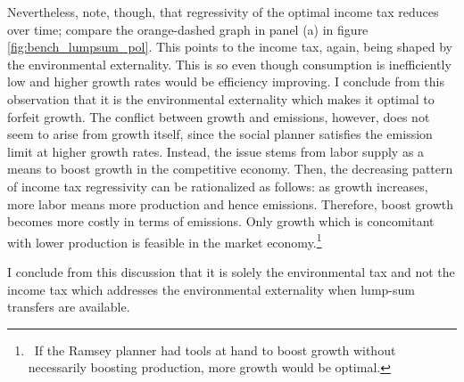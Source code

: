 Nevertheless, note, though, that regressivity of the optimal income tax reduces over time; compare the orange-dashed graph in panel (a) in figure \ref{fig:bench_lumpsum_pol}. This points to the income tax, again, being shaped by the environmental externality.
This is so even though consumption is inefficiently low and higher growth rates would be efficiency improving. I conclude from this observation that it is the environmental externality which makes it optimal to forfeit growth. 
The conflict between growth and emissions, however, does not seem to arise from growth itself, since the social planner satisfies the emission limit at higher growth rates. Instead, the issue stems from labor supply as a means to boost growth in the competitive economy. 
Then, the decreasing pattern of income tax regressivity can be rationalized as follows: as growth increases, more labor means more production and hence emissions. Therefore, boost growth becomes more costly in terms of emissions. Only growth which is concomitant with lower production is feasible in the market economy.\footnote{\ If the Ramsey planner had tools at hand to boost growth without necessarily boosting production, more growth would be optimal. }

I conclude from this discussion that it is solely the environmental tax and not the income tax which addresses the environmental externality when lump-sum transfers are available.
